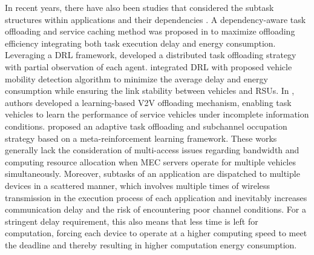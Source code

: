 \documentclass[lettersize,journal]{IEEEtran}
\begin{document}
In recent years, there have also been studies that considered the subtask structures within applications and their dependencies \cite{ref22,ref23,ref24,ref25,ref26}. A dependency-aware task offloading and service caching method was proposed in \cite{ref22} to maximize offloading efficiency integrating both task execution delay and energy consumption. Leveraging a DRL framework, \cite{ref23} developed a distributed task offloading strategy with partial observation of each agent. \cite{ref24} integrated DRL with proposed vehicle mobility detection algorithm to minimize the average delay and energy consumption while ensuring the link stability between vehicles and RSUs. In \cite{ref25}, authors developed a learning-based V2V offloading mechanism, enabling task vehicles to learn the performance of service vehicles under incomplete information conditions.
\cite{ref26} proposed an adaptive task offloading and subchannel occupation strategy based on a meta-reinforcement learning framework. These works generally lack the consideration of multi-access issues regarding bandwidth and computing resource allocation when MEC servers operate for multiple vehicles simultaneously. Moreover, subtasks of an application are dispatched to multiple devices in a scattered manner, which involves multiple times of wireless 
transmission in the execution process of each application and inevitably increases communication delay and the risk of encountering poor channel conditions. For a stringent delay requirement, this also means that less time is left for computation, forcing each device to operate at a higher computing speed to meet the deadline and thereby resulting in higher computation energy consumption.
\end{document}

